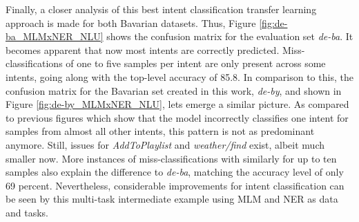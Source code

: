 \documentclass[11pt,a4paper,twoside,openright]{scrbook}
\begin{document}
Finally, a closer analysis of this best intent classification transfer learning approach is made for both Bavarian datasets. Thus, Figure \ref{fig:de-ba_MLMxNER_NLU} shows the confusion matrix for the evaluation set \textit{de-ba}. It becomes apparent that now most intents are correctly predicted. Miss-classifications of one to five samples per intent are only present across some intents, going along with the top-level accuracy of 85.8. In comparison to this, the confusion matrix for the Bavarian set created in this work, \textit{de-by}, and shown in Figure \ref{fig:de-by_MLMxNER_NLU}, lets emerge a similar picture. As compared to previous figures which show that the model incorrectly classifies one intent for samples from almost all other intents, this pattern is not as predominant anymore. Still, issues for \textit{AddToPlaylist} and \textit{weather/find} exist, albeit much smaller now. More instances of miss-classifications with similarly for up to ten samples also explain the difference to \textit{de-ba}, matching the accuracy level of only 69 percent. Nevertheless, considerable improvements for intent classification can be seen by this multi-task intermediate example using MLM and NER as data and tasks.

\begin{table}[!ht]
\caption{Results for the extended sequential intermediate multi-task MLMxNER\_NLU experiment with mDeBERTa according to Upper German dialects over three random seeds, Avg. = average on languages without English, German and Swiss German, Diff. = average performance difference to mDeBERTa baseline, sd = standard deviation}
\label{tab:mDeBERTa_exp4_mlmner_nlu_dialects}
\end{table}
\end{document}
